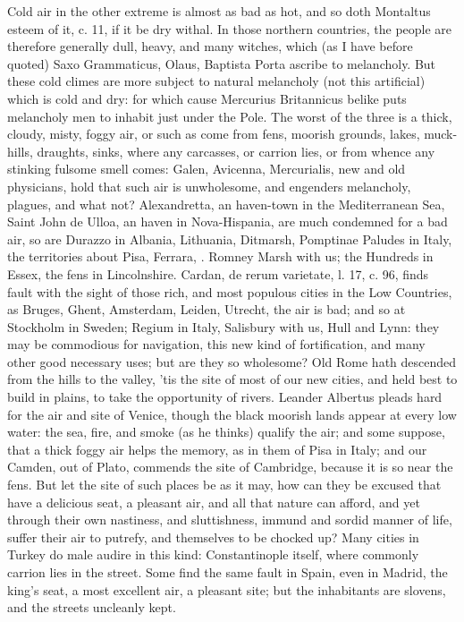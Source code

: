 {{Cold air in the other extreme is almost as bad as hot, and so doth
Montaltus esteem of it, c. 11, if it be dry withal. In those northern
countries, the people are therefore generally dull, heavy, and many
witches, which (as I have before quoted) Saxo Grammaticus, Olaus,
Baptista Porta ascribe to melancholy. But these cold climes are more
subject to natural melancholy (not this artificial) which is cold and
dry: for which cause Mercurius Britannicus belike puts melancholy
men to inhabit just under the Pole. The worst of the three is a
thick, cloudy, misty, foggy air, or such as come from fens,
moorish grounds, lakes, muck-hills, draughts, sinks, where any
carcasses, or carrion lies, or from whence any stinking fulsome smell
comes: Galen, Avicenna, Mercurialis, new and old physicians, hold that
such air is unwholesome, and engenders melancholy, plagues, and what
not? Alexandretta, an haven-town in the Mediterranean Sea, Saint
John de Ulloa, an haven in Nova-Hispania, are much condemned for a bad
air, so are Durazzo in Albania, Lithuania, Ditmarsh, Pomptinae Paludes
in Italy, the territories about Pisa, Ferrara, \etc{}. Romney Marsh with
us; the Hundreds in Essex, the fens in Lincolnshire. Cardan, de rerum
varietate, l. 17, c. 96, finds fault with the sight of those rich, and
most populous cities in the Low Countries, as Bruges, Ghent, Amsterdam,
Leiden, Utrecht, \etc{} the air is bad; and so at Stockholm in Sweden;
Regium in Italy, Salisbury with us, Hull and Lynn: they may be
commodious for navigation, this new kind of fortification, and many
other good necessary uses; but are they so wholesome? Old Rome hath
descended from the hills to the valley, 'tis the site of most of our
new cities, and held best to build in plains, to take the opportunity
of rivers. Leander Albertus pleads hard for the air and site of Venice,
though the black moorish lands appear at every low water: the sea,
fire, and smoke (as he thinks) qualify the air; and some suppose,
that a thick foggy air helps the memory, as in them of Pisa in Italy;
and our Camden, out of Plato, commends the site of Cambridge, because
it is so near the fens. But let the site of such places be as it may,
how can they be excused that have a delicious seat, a pleasant air, and
all that nature can afford, and yet through their own nastiness, and
sluttishness, immund and sordid manner of life, suffer their air to
putrefy, and themselves to be chocked up? Many cities in Turkey do male
audire in this kind: Constantinople itself, where commonly carrion lies
in the street. Some find the same fault in Spain, even in Madrid, the
king's seat, a most excellent air, a pleasant site; but the inhabitants
are slovens, and the streets uncleanly kept.

}}
